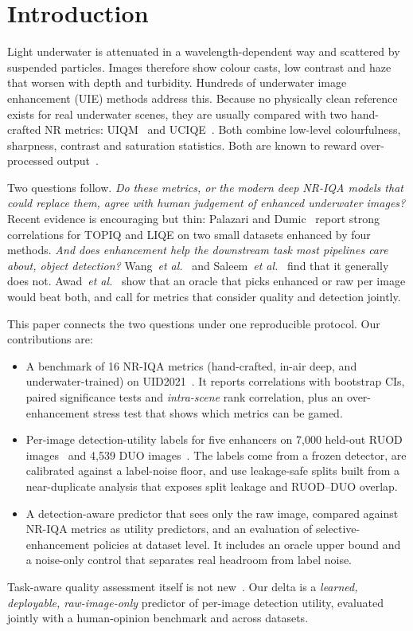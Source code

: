 \documentclass[conference]{IEEEtran}
\begin{document}
\section{Introduction}
Light underwater is attenuated in a wavelength-dependent way and scattered by suspended particles. Images therefore show colour casts, low contrast and haze that worsen with depth and turbidity. Hundreds of underwater image enhancement (UIE) methods address this. Because no physically clean reference exists for real underwater scenes, they are usually compared with two hand-crafted NR metrics: UIQM~\cite{panetta2016uiqm} and UCIQE~\cite{yang2015uciqe}. Both combine low-level colourfulness, sharpness, contrast and saturation statistics. Both are known to reward over-processed output~\cite{li2020uieb,li2022limits}.

Two questions follow. \emph{Do these metrics, or the modern deep NR-IQA models that could replace them, agree with human judgement of enhanced underwater images?} Recent evidence is encouraging but thin: Palazari and Dumic~\cite{palazari2026reliable} report strong correlations for TOPIQ and LIQE on two small datasets enhanced by four methods. \emph{And does enhancement help the downstream task most pipelines care about, object detection?} Wang~\textit{et al.}~\cite{wang2024isuie} and Saleem~\textit{et al.}~\cite{saleem2025influence} find that it generally does not. Awad~\textit{et al.}~\cite{awad2026revisiting} show that an oracle that picks enhanced or raw per image would beat both, and call for metrics that consider quality and detection jointly.

This paper connects the two questions under one reproducible protocol. Our contributions are:
\begin{itemize}
\item A benchmark of 16 NR-IQA metrics (hand-crafted, in-air deep, and underwater-trained) on UID2021~\cite{hou2023uid2021}. It reports correlations with bootstrap CIs, paired significance tests and \emph{intra-scene} rank correlation, plus an over-enhancement stress test that shows which metrics can be gamed.
\item Per-image detection-utility labels for five enhancers on 7{,}000 held-out RUOD images~\cite{fu2023ruod} and 4{,}539 DUO images~\cite{liu2021duo}. The labels come from a frozen detector, are calibrated against a label-noise floor, and use leakage-safe splits built from a near-duplicate analysis that exposes split leakage and RUOD--DUO overlap.
\item A detection-aware predictor that sees only the raw image, compared against NR-IQA metrics as utility predictors, and an evaluation of selective-enhancement policies at dataset level. It includes an oracle upper bound and a noise-only control that separates real headroom from label noise.
\end{itemize}
Task-aware quality assessment itself is not new~\cite{awad2026revisiting}. Our delta is a \emph{learned, deployable, raw-image-only} predictor of per-image detection utility, evaluated jointly with a human-opinion benchmark and across datasets.
\end{document}
